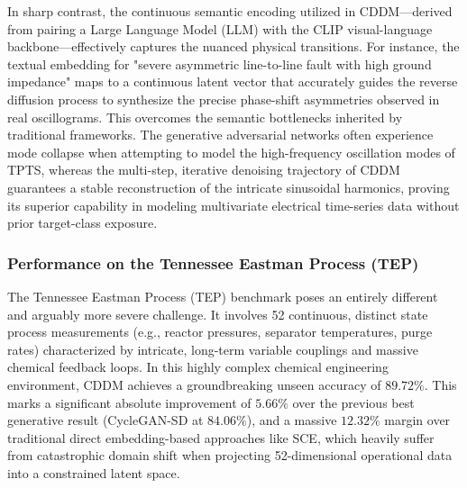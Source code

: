 In sharp contrast, the continuous semantic encoding utilized in CDDM—derived from pairing a Large Language Model (LLM) with the CLIP visual-language backbone—effectively captures the nuanced physical transitions. For instance, the textual embedding for "severe asymmetric line-to-line fault with high ground impedance" maps to a continuous latent vector that accurately guides the reverse diffusion process to synthesize the precise phase-shift asymmetries observed in real oscillograms. This overcomes the semantic bottlenecks inherited by traditional frameworks. The generative adversarial networks often experience mode collapse when attempting to model the high-frequency oscillation modes of TPTS, whereas the multi-step, iterative denoising trajectory of CDDM guarantees a stable reconstruction of the intricate sinusoidal harmonics, proving its superior capability in modeling multivariate electrical time-series data without prior target-class exposure.

\subsubsection{Performance on the Tennessee Eastman Process (TEP)}
The Tennessee Eastman Process (TEP) benchmark poses an entirely different and arguably more severe challenge. It involves 52 continuous, distinct state process measurements (e.g., reactor pressures, separator temperatures, purge rates) characterized by intricate, long-term variable couplings and massive chemical feedback loops. In this highly complex chemical engineering environment, CDDM achieves a groundbreaking unseen accuracy of $89.72\%$. This marks a significant absolute improvement of $5.66\%$ over the previous best generative result (CycleGAN-SD at $84.06\%$), and a massive $12.32\%$ margin over traditional direct embedding-based approaches like SCE, which heavily suffer from catastrophic domain shift when projecting 52-dimensional operational data into a constrained latent space.


